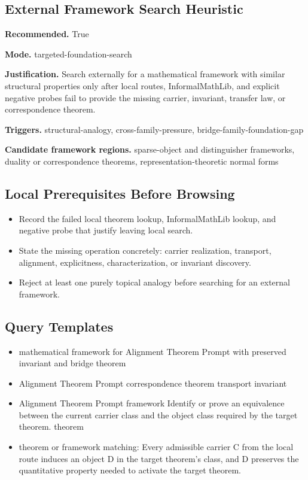 \documentclass[11pt]{article}
\begin{document}
\subsection*{External Framework Search Heuristic}
\textbf{Recommended.} True

\textbf{Mode.} targeted-foundation-search

\textbf{Justification.} Search externally for a mathematical framework with similar structural properties only after local routes, InformalMathLib, and explicit negative probes fail to provide the missing carrier, invariant, transfer law, or correspondence theorem.

\textbf{Triggers.} structural-analogy, cross-family-pressure, bridge-family-foundation-gap

\textbf{Candidate framework regions.} sparse-object and distinguisher frameworks, duality or correspondence theorems, representation-theoretic normal forms

\subsection*{Local Prerequisites Before Browsing}
\begin{itemize}[leftmargin=*,itemsep=0.2em]
\item Record the failed local theorem lookup, InformalMathLib lookup, and negative probe that justify leaving local search.
\item State the missing operation concretely: carrier realization, transport, alignment, explicitness, characterization, or invariant discovery.
\item Reject at least one purely topical analogy before searching for an external framework.
\end{itemize}
\subsection*{Query Templates}
\begin{itemize}[leftmargin=*,itemsep=0.2em]
\item mathematical framework for Alignment Theorem Prompt with preserved invariant and bridge theorem
\item Alignment Theorem Prompt correspondence theorem transport invariant
\item Alignment Theorem Prompt framework Identify or prove an equivalence between the current carrier class and the object class required by the target theorem. theorem
\item theorem or framework matching: Every admissible carrier C from the local route induces an object D in the target theorem's class, and D preserves the quantitative property needed to activate the target theorem.
\end{itemize}
\end{document}
